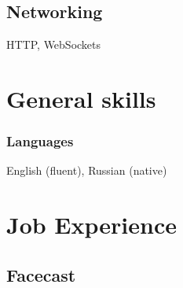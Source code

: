 \documentclass[paper=a4,fontsize=11pt]{scrartcl}
\begin{document}
\subsection{Networking}
HTTP, WebSockets

\section{General skills}

\subsubsection{Languages}
English (fluent), Russian (native)

\section{Job Experience}

\subsection{Facecast}
\end{document}
